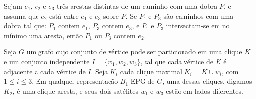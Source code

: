 \begin{fac} \label{f:between}Sejam $e_1$, $e_2$ e $e_3$  três arestas distintas de um caminho com uma dobra $P$, e assuma que $e_2$ está entre  $e_1$ e $e_3$ sobre $P$. Se $P_1$ e $P_3$ são caminhos com uma dobra tal que: $P_1$ contem $e_1$, $P_3$ contem $e_3$, e  $P_1$ e $P_3$ intersectam-se em no mínimo uma aresta, então $P_1$ ou $P_3$ contem $e_2$.
\end{fac}

\begin{lema}\label{coro:3Cliques1EdgeClique}
Seja $G$ um grafo cujo conjunto de vértice pode ser particionado em uma  clique $K$ e um conjunto independente $I=\{w_1,w_2,w_3\}$,  tal que cada vértice de $K$ é adjacente a cada vértice de $I$.  Seja $K_i$ cada clique maximal   $K_i = K \cup w_i$, com $1 \leq i \leq 3$.
Em qualquer representação $B_1$-EPG de $G$, uma dessas cliques, digamos $K_2$, é uma clique-aresta, e seus dois  satélites $w_1$ e $w_3$ estão em lados diferentes.
\end{lema}


